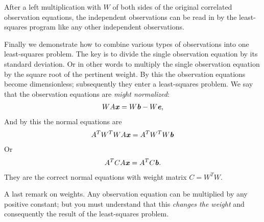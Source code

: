 After a left multiplication with $W$ of both sides of the original correlated observation equations, the independent observations can be read in by the least-squares program like any other independent observations.

Finally we demonstrate how to combine various types of observations into one least-squares problem. The key is to divide the single observation equation by its standard deviation. Or in other words to multiply the single observation equation by the square root of the pertinent weight. By this the observation equations become dimensionless; subsequently they enter a least-squares problem. We say that the observation equations are\textit{ might normalized}:
\begin{align}
WA\textbf{\textit{x}} = W\textbf{\textit{b}}-W\textbf{\textit{e}},
\end{align}
And by this the normal equations are
\begin{align}
A^{T}W^{T}WA\textbf{\textit{x}}=A^{T}W^{T}W\textbf{\textit{b}}
\end{align}
Or
\begin{align}
A^{T}CA\textbf{\textit{x}}=A^{T}C\textbf{\textit{b}}.
\end{align}
They are the correct normal equations with weight matrix $ C=W^{T}W$.

A last remark on weights. Any observation equation can be multiplied by any positive constant; but you must understand that this\textit{ changes the weight} and consequently the result of the least-squares problem.